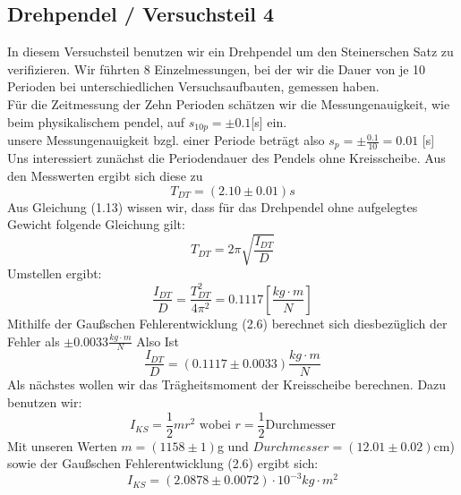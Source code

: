 \documentclass[11pt,a4paper]{article}
\begin{document}
	\subsection{Drehpendel / Versuchsteil 4}
	In diesem Versuchsteil benutzen wir ein Drehpendel um den Steinerschen Satz zu verifizieren.
	Wir führten 8 Einzelmessungen, bei der wir die  Dauer von je 10 Perioden bei unterschiedlichen Versuchsaufbauten, gemessen haben.\\
	Für die Zeitmessung der Zehn Perioden schätzen wir die Messungenauigkeit, wie beim physikalischem pendel, auf $s_{10p}=\pm 0.1$[s] ein.\\
	unsere Messungenauigkeit bzgl. einer Periode beträgt also $s_p=\pm \frac{0.1}{10} =0.01$ [s]
	\\
	Uns interessiert zunächst die Periodendauer des Pendels ohne Kreisscheibe. Aus den Messwerten
	ergibt sich diese zu $$T_{DT}=(2.10\pm 0.01)s$$
	Aus Gleichung (1.13) wissen wir, dass für das Drehpendel ohne aufgelegtes Gewicht folgende Gleichung gilt:
	\begin{equation}
	T_{DT}=2 \pi \sqrt{\frac{I_{DT}}{D}}
	\end{equation}
	Umstellen ergibt:
	\begin{equation}
	\frac{I_{DT}}{D} = \frac{T_{DT}^2}{4 \pi^2}=0.1117[\frac{kg\cdot m}{N}]
	\end{equation}
	Mithilfe der Gaußschen Fehlerentwicklung (2.6) berechnet sich diesbezüglich der Fehler als $\pm 0.0033
	\frac{kg \cdot m}{N}$
	Also Ist 
	\begin{equation}
	\frac{I_{DT}}{D} =(0.1117 \pm 0.0033)\frac{kg\cdot m}{N}
	\end{equation}
	Als nächstes wollen wir das Trägheitsmoment der Kreisscheibe berechnen. Dazu benutzen wir:
	\begin{equation}
	I_{KS}=\frac{1}{2}m r^2 \text{  wobei  } r=\frac{1}{2} \text{Durchmesser}
	\end{equation}
	Mit unseren Werten $m=(1158\pm 1)$g und $Durchmesser=(12.01 \pm 0.02)$cm) sowie der Gaußschen
	Fehlerentwicklung (2.6) ergibt sich:
	\begin{equation}
	I_{KS}=(2.0878 \pm 0.0072)\cdot 10^{-3} kg \cdot m^2
	\end{equation}
\end{document}
